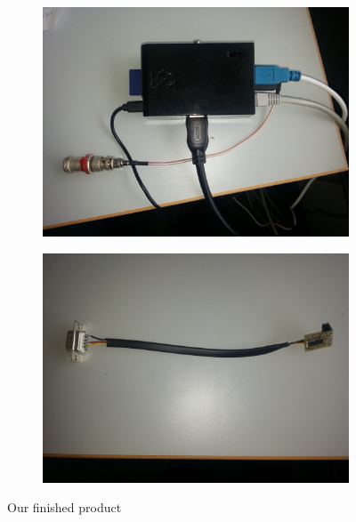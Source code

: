\begin{figure}
\begin{subfigure}{.5\textwidth}
	\centering
	\includegraphics[width=\textwidth]{Figures/rasp-1}
	\label{fig:pien}
\end{subfigure}
\begin{subfigure}{.5\textwidth}
	\centering
	\includegraphics[width=\textwidth]{Figures/rasp-2}
	\label{fig:kabeln}
\end{subfigure}
\caption{Our finished product}
\end{figure}
